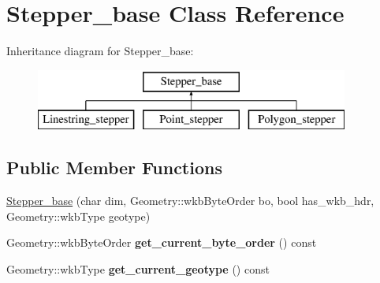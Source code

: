 \hypertarget{classStepper__base}{}\section{Stepper\+\_\+base Class Reference}
\label{classStepper__base}
Inheritance diagram for Stepper\+\_\+base\+:\begin{figure}[H]
\begin{center}
\leavevmode
\includegraphics[height=2.000000cm]{classStepper__base}
\end{center}
\end{figure}
\subsection*{Public Member Functions}
\begin{DoxyCompactItemize}
\item 
\mbox{\hyperlink{classStepper__base_ab6edd059bec858fb19310e767f6ed681}{Stepper\+\_\+base}} (char dim, Geometry\+::wkb\+Byte\+Order bo, bool has\+\_\+wkb\+\_\+hdr, Geometry\+::wkb\+Type geotype)
\item 
\mbox{\label{classStepper__base_a01a91966baa0a5286940f74652f4f654}} 
Geometry\+::wkb\+Byte\+Order {\bfseries get\+\_\+current\+\_\+byte\+\_\+order} () const
\item 
\mbox{\label{classStepper__base_afd628e831a105c086887d79caa76fb12}} 
Geometry\+::wkb\+Type {\bfseries get\+\_\+current\+\_\+geotype} () const
\end{DoxyCompactItemize}
